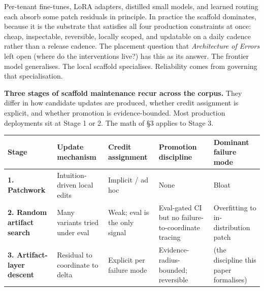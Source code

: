 Per-tenant fine-tunes, LoRA adapters, distilled small models, and
learned routing each absorb some patch residuals in principle. In
practice the scaffold dominates, because it is the substrate that
satisfies all four production constraints at once: cheap, inspectable,
reversible, locally scoped, and updatable on a daily cadence rather than
a release cadence. The placement question that \emph{Architecture of
Errors} left open (where do the interventions live?) has this as its
answer. The frontier model generalises. The local scaffold specialises.
Reliability comes from governing that specialisation.

\textbf{Three stages of scaffold maintenance recur across the corpus.}
They differ in how candidate updates are produced, whether credit
assignment is explicit, and whether promotion is evidence-bounded. Most
production deployments sit at Stage 1 or 2. The math of §3 applies to
Stage 3.

{\def\LTcaptype{none} %
\begin{longtable}[]{@{}
  >{\raggedright\arraybackslash}p{}
  >{\raggedright\arraybackslash}p{}
  >{\raggedright\arraybackslash}p{}
  >{\raggedright\arraybackslash}p{}
  >{\raggedright\arraybackslash}p{}@{}}
\toprule\noalign{}
\begin{minipage}[b]{\linewidth}\raggedright
Stage
\end{minipage} & \begin{minipage}[b]{\linewidth}\raggedright
Update mechanism
\end{minipage} & \begin{minipage}[b]{\linewidth}\raggedright
Credit assignment
\end{minipage} & \begin{minipage}[b]{\linewidth}\raggedright
Promotion discipline
\end{minipage} & \begin{minipage}[b]{\linewidth}\raggedright
Dominant failure mode
\end{minipage} \\
\midrule\noalign{}
\endhead
\bottomrule\noalign{}
\endlastfoot
\textbf{1. Patchwork} & Intuition-driven local edits & Implicit / ad hoc
& None & Bloat \\
\textbf{2. Random artifact search} & Many variants tried under eval &
Weak; eval is the only signal & Eval-gated CI but no
failure-to-coordinate tracing & Overfitting to in-distribution patch \\
\textbf{3. Artifact-layer descent} & Residual to coordinate to delta &
Explicit per failure mode & Evidence-radius-bounded; reversible & (the
discipline this paper formalises) \\
\end{longtable}
}

